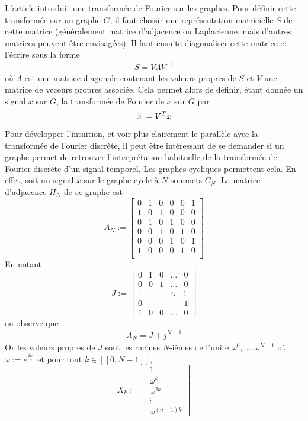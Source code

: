 \documentclass[11pt]{article}
\begin{document}
L'article introduit une transformée de Fourier sur les graphes. Pour définir cette transformée sur un graphe $G$, il faut choisir une représentation matricielle $S$ de cette matrice (généralement matrice d'adjacence ou Laplacienne, mais d'autres matrices peuvent être envisagées). Il faut ensuite diagonaliser cette matrice et l'écrire sous la forme
\begin{align}
    S = V\Lambda V^{-1}
\end{align}
où $\Lambda$ est une matrice diagonale contenant les valeurs propres de $S$ et $V$ une matrice de veceurs propres associée. Cela permet alors de définir, étant donnée un signal $x$ sur $G$, la transformée de Fourier de $x$ sur $G$ par
\begin{equation}
    \Tilde{x} := V^Tx \label{eq:GFT}
\end{equation}
Pour développer l'intuition, et voir plus clairement le parallèle avec la transformée de Fourier discrète, il peut être intéressant de se demander si un graphe permet de retrouver l'interprétation habituelle de la transformée de Fourier discrète d'un signal temporel. Les graphes cycliques permettent cela. En effet, soit un signal $x$ sur le graphe cycle à $N$ sommets $C_N$. La matrice d'adjacence $H_N$ de ce graphe est 
\[ A_N := 
\begin{bmatrix}
0 & 1 & 0 & 0 & 0 & 1 \\
1 & 0 & 1 & 0 & 0 & 0 \\
0 & 1 & 0 & 1 & 0 & 0 \\
0 & 0 & 1 & 0 & 1 & 0 \\
0 & 0 & 0 & 1 & 0 & 1 \\
1 & 0 & 0 & 0 & 1 & 0 \\
\end{bmatrix}
\]
En notant
\[J :=
\begin{bmatrix}
0 & 1 & 0 & \dots & 0 \\
0 & 0 & 1 & \dots & 0 \\
\vdots  &     &     & \ddots & \vdots  \\
0 & & &        & 1 \\
1 & 0 & 0 & \dots  & 0
\end{bmatrix}
\]
on observe que 
\begin{align}
    A_N = J + j^{N-1}
\end{align}
Or les valeurs propres de $J$ sont les racines $N$-ièmes de l'unité $\omega^0,...,\omega^{N-1}$ où $\omega := e^{\frac{2i\pi}{n}}$ et pour tout $k\in [\![0,N-1]\!]$, \[X_k := \begin{bmatrix} 1 \\\omega^k \\ \omega^{2k}\\ \vdots\\ \omega^{(n-1)k}\end{bmatrix}\]
\end{document}
